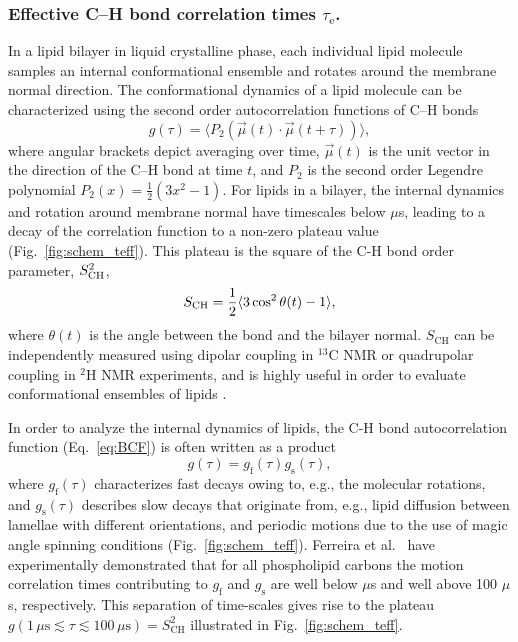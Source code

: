 \documentclass[journal=jcisd8,manuscript=article,layout=twocolumn]{achemso}
\begin{document}
\subsubsection*{Effective C--H bond correlation times $\tau_\mathrm{e}$.}
In a lipid bilayer in liquid crystalline phase, each individual lipid molecule samples an internal conformational
ensemble and rotates around
the membrane normal direction.
The conformational dynamics of a lipid molecule can be characterized using
the second order autocorrelation functions of C--H bonds %
\begin{equation}
\label{eq:BCF}
g(\tau)=\langle P_{2}\left(\vec{\mu}(t)\cdot \vec{\mu}(t+\tau)\right)\rangle ,
\end{equation}
where angular brackets depict averaging over time,
$\vec{\mu}(t)$ is the unit vector in the direction of the C--H bond at time $t$, and $P_{2}$ is the second order Legendre polynomial $P_2(x)=\frac{1}{2}(3x^2-1)$.
For lipids in a bilayer, the internal dynamics and rotation around membrane normal
have timescales below $\mu$s, leading to a decay of the correlation function to a non-zero plateau value (Fig.~\ref{fig:schem_teff}).
This plateau is the square of the C-H bond order parameter, $S^{2}_{\rm{CH}}$, 
\begin{equation}
\label{eq:OP}
S_{\rm{CH}}=\frac{1}{2}\langle 3\cos^{2}\theta(t)-1\rangle ,
\end{equation}
where $\theta(t)$ is the angle between the bond and the bilayer normal.
$S_\mathrm{CH}$ can be independently measured using dipolar coupling in $^{13}$C NMR or quadrupolar coupling in $^{2}$H NMR experiments,
and is highly useful in order to evaluate conformational ensembles of lipids \cite{Ollila:2016a}.

In order to analyze the internal dynamics of lipids, 
the C-H bond autocorrelation function (Eq.~\eqref{eq:BCF}) is often written as a product %
\begin{equation}
g(\tau)=g_{\mathrm{f}}(\tau)g_{\mathrm{s}}(\tau) ,
\end{equation}
where $g_{\mathrm{f}}(\tau)$ characterizes fast decays owing to, e.g., the molecular  rotations, and $g_{\mathrm{s}}(\tau)$ describes slow decays that originate from, e.g., lipid diffusion between lamellae with different orientations, and periodic motions due to the use of magic angle spinning conditions (Fig.~\ref{fig:schem_teff}).
Ferreira et al.~\cite{ferreira15} have experimentally demonstrated that for all phospholipid carbons
the motion correlation times contributing to $g_{\mathrm{f}}$ and $g_{\mathrm{s}}$ are well below $\mu$s and well above 100 $\mu$s, respectively.
This separation of time-scales gives rise to the plateau $g(1\,\mu\mathrm s  \lesssim \tau \lesssim 100\,\mu\mathrm s)=S^2_\mathrm{CH}$ illustrated in Fig.~\ref{fig:schem_teff}.
\end{document}
